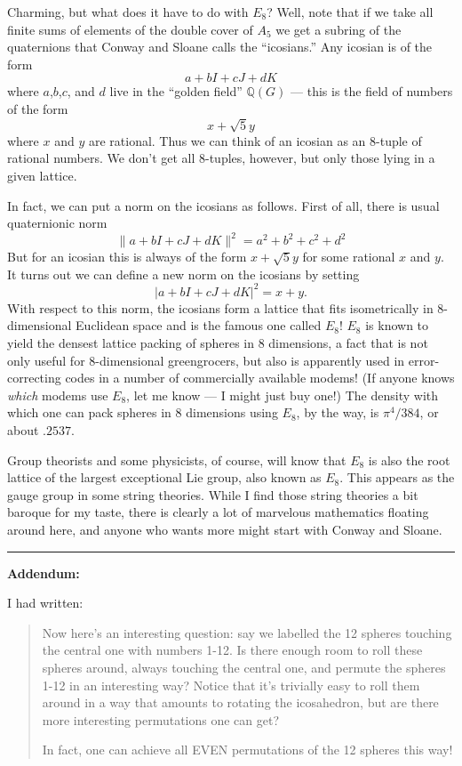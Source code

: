 \documentclass{article}
\begin{document}
Charming, but what does it have to do with \(E_8\)? Well, note that if
we take all finite sums of elements of the double cover of \(A_5\) we
get a subring of the quaternions that Conway and Sloane calls the
``icosians.'' Any icosian is of the form \[a + bI + cJ + dK\] where
\(a\),\(b\),\(c\), and \(d\) live in the ``golden field''
\(\mathbb{Q}(G)\) --- this is the field of numbers of the form
\[x + \sqrt{5} y\] where \(x\) and \(y\) are rational. Thus we can think
of an icosian as an 8-tuple of rational numbers. We don't get all
8-tuples, however, but only those lying in a given lattice.

In fact, we can put a norm on the icosians as follows. First of all,
there is usual quaternionic norm
\[\|a + bI + cJ + dK\|^2 = a^2 + b^2 + c^2 + d^2\] But for an icosian
this is always of the form \(x + \sqrt{5} y\) for some rational \(x\)
and \(y\). It turns out we can define a new norm on the icosians by
setting \[|a + bI + cJ + dK|^2 = x + y.\] With respect to this norm, the
icosians form a lattice that fits isometrically in 8-dimensional
Euclidean space and is the famous one called \(E_8\)! \(E_8\) is known
to yield the densest lattice packing of spheres in 8 dimensions, a fact
that is not only useful for 8-dimensional greengrocers, but also is
apparently used in error-correcting codes in a number of commercially
available modems! (If anyone knows \emph{which} modems use \(E_8\), let
me know --- I might just buy one!) The density with which one can pack
spheres in 8 dimensions using \(E_8\), by the way, is \(\pi^4/384\), or
about \(.2537\).

Group theorists and some physicists, of course, will know that \(E_8\)
is also the root lattice of the largest exceptional Lie group, also
known as \(E_8\). This appears as the gauge group in some string
theories. While I find those string theories a bit baroque for my taste,
there is clearly a lot of marvelous mathematics floating around here,
and anyone who wants more might start with Conway and Sloane.

\begin{center}\rule{0.5\linewidth}{0.5pt}\end{center}

\textbf{Addendum:}

I had written:

\begin{quote}
Now here's an interesting question: say we labelled the 12 spheres
touching the central one with numbers 1-12. Is there enough room to roll
these spheres around, always touching the central one, and permute the
spheres 1-12 in an interesting way? Notice that it's trivially easy to
roll them around in a way that amounts to rotating the icosahedron, but
are there more interesting permutations one can get?

In fact, one can achieve all EVEN permutations of the 12 spheres this
way!
\end{quote}
\end{document}
